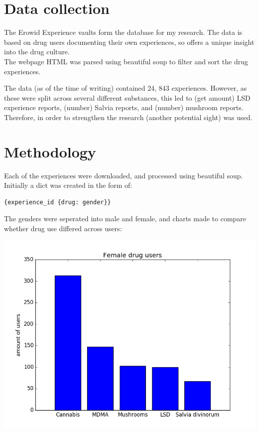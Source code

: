 \documentclass{article}
\begin{document}
\section{Data collection}
The Erowid Experience vaults form the database for my research. The data is based on drug users documenting their own experiences, so offers a unique insight into the drug culture. \\ 
The webpage HTML was parsed using beautiful soup to filter and sort the drug experiences. 

The data (as of the time of writing) contained 24, 843 experiences. However, as these were split across several different substances, this led to (get amount) LSD experience reports, (number) Salvia reports, and (number) mushroom reports. Therefore, in order to strengthen the research (another potential sight) was used. 

\section{Methodology}

Each of the experiences were downloaded, and processed using beautiful soup. Initially a dict was created in the form of:

\begin{lstlisting}
{experience_id {drug: gender}}
\end{lstlisting}

The genders were seperated into male and female, and charts made to compare whether drug use differed across users:

\includegraphics{graphs/top_female_drugs}
\end{document}
